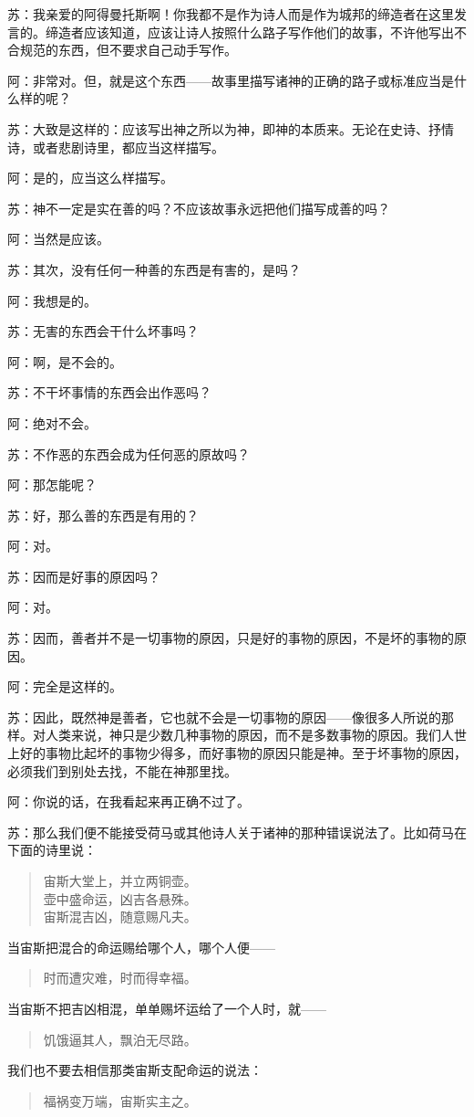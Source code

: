 \documentclass[11pt,oneside]{book}
\begin{document}
\begin{common-format}
苏：我亲爱的阿得曼托斯啊！你我都不是作为诗人而是作为城邦的缔造者在这里发言的。缔造者应该知道，应该让诗人按照什么路子写作他们的故事，不许他写出不合规范的东西，但不要求自己动手写作。

阿：非常对。但，就是这个东西——故事里描写诸神的正确的路子或标准应当是什么样的呢？

苏：大致是这样的：应该写出神之所以为神，即神的本质来。无论在史诗、抒情诗，或者悲剧诗里，都应当这样描写。

阿：是的，应当这么样描写。

苏：神不一定是实在善的吗？不应该故事永远把他们描写成善的吗？

阿：当然是应该。

苏：其次，没有任何一种善的东西是有害的，是吗？

阿：我想是的。

苏：无害的东西会干什么坏事吗？

阿：啊，是不会的。

苏：不干坏事情的东西会出作恶吗？

阿：绝对不会。

苏：不作恶的东西会成为任何恶的原故吗？

阿：那怎能呢？

苏：好，那么善的东西是有用的？

阿：对。

苏：因而是好事的原因吗？

阿：对。

苏：因而，善者并不是一切事物的原因，只是好的事物的原因，不是坏的事物的原因。

阿：完全是这样的。

苏：因此，既然神是善者，它也就不会是一切事物的原因——像很多人所说的那样。对人类来说，神只是少数几种事物的原因，而不是多数事物的原因。我们人世上好的事物比起坏的事物少得多，而好事物的原因只能是神。至于坏事物的原因，必须我们到别处去找，不能在神那里找。

阿：你说的话，在我看起来再正确不过了。

苏：那么我们便不能接受荷马或其他诗人关于诸神的那种错误说法了。比如荷马在下面的诗里说：
\begin{verse}
宙斯大堂上，并立两铜壶。\\
壶中盛命运，凶吉各悬殊。\\
宙斯混吉凶，随意赐凡夫。
\end{verse}
当宙斯把混合的命运赐给哪个人，哪个人便——
\begin{verse}
时而遭灾难，时而得幸福。
\end{verse}
当宙斯不把吉凶相混，单单赐坏运给了一个人时，就——
\begin{verse}
饥饿逼其人，飘泊无尽路。
\end{verse}
我们也不要去相信那类宙斯支配命运的说法：
\begin{verse}
福祸变万端，宙斯实主之。
\end{verse}


\end{common-format}
\end{document}
